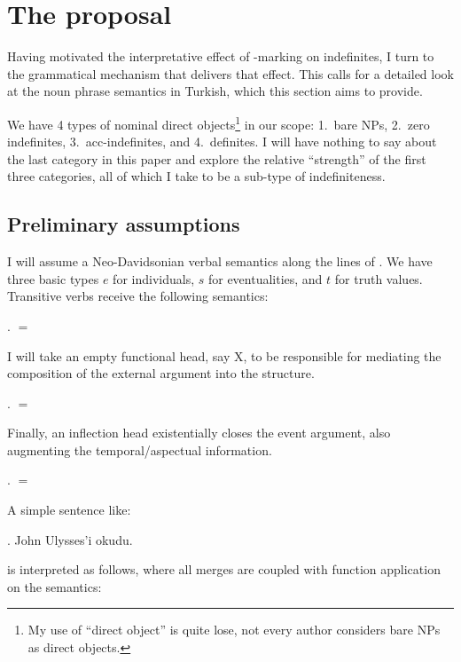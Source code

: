 \documentclass[11pt,a4paper]{article}
\begin{document}
\section{The proposal}

Having motivated the interpretative effect of \acc-marking on indefinites, I turn to the grammatical mechanism that delivers that effect. This calls for a detailed look at the noun phrase semantics in Turkish, which this section aims to provide.

We have 4 types of nominal direct objects\footnote{My use of ``direct object'' is quite lose, not every author considers bare NPs as direct objects.} in our scope: 1.\ bare NPs, 2.\ zero indefinites, 3.\ acc-indefinites, and 4.\ definites. I will have nothing to say about the last category in this paper and explore the relative ``strength'' of the first three categories, all of which I take to be a sub-type of indefiniteness. 

\subsection{Preliminary assumptions}

I will assume a Neo-Davidsonian verbal semantics along the lines of \cite{kratzer96}. We have three basic types $e$ for individuals, $s$ for eventualities, and $t$ for truth values. Transitive verbs receive the following semantics:

\ex.  $=$ 

I will take an empty functional head, say X, to be responsible for mediating the composition of the external argument into the structure.

\ex.  $=$ 

Finally, an inflection head existentially closes the event argument, also augmenting the temporal/aspectual information.

\ex.  $=$ 

A simple sentence like:

\ex. John Ulysses'i okudu.

is interpreted as follows, where all merges are coupled with function application on the semantics:
\end{document}
